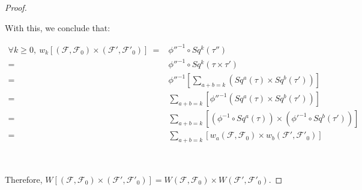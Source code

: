 \documentclass[12pt,oneside]{book}
\newcommand{\ds}{\displaystyle}
\begin{document}
\begin{proof}
        \

    	With this, we conclude that:

    	$\begin{array}{rl}
    		\forall k\geq 0, \ w_{k}[(\mathcal{F},\mathcal{F}_{0})\times (\mathcal{F'},\mathcal{F'}_{0})] \ = & \phi''^{-1}\circ Sq^{k}(\tau'') \\
    		= & \phi''^{-1}\circ Sq^{k}(\tau\times \tau') \\
    		= & \phi''^{-1}\left[ \ds\sum_{a+b=k}\left( Sq^{a}(\tau)\times Sq^{b}(\tau')\right) \right] \\
    		= & \ds\sum_{a+b=k}\left[\phi''^{-1} \left( Sq^{a}(\tau)\times Sq^{b}(\tau')\right) \right] \\
    		= & \ds\sum_{a+b=k}\left[ \left( \phi^{-1}\circ Sq^{a}(\tau) \right)\times \left( \phi'^{-1}\circ Sq^{b}(\tau') \right)\right] \\
    		= & \ds\sum_{a+b=k}\left[ w_{a}(\mathcal{F},\mathcal{F}_{0})\times w_{b}(\mathcal{F'},\mathcal{F'}_{0}) \right]
    	\end{array}$

        \

    	Therefore, 
        $W[(\mathcal{F},\mathcal{F}_{0})\times (\mathcal{F'},\mathcal{F'}_{0})]=W(\mathcal{F},\mathcal{F}_{0})\times W(\mathcal{F'},\mathcal{F'}_{0})$.

    \end{proof}
\end{document}
